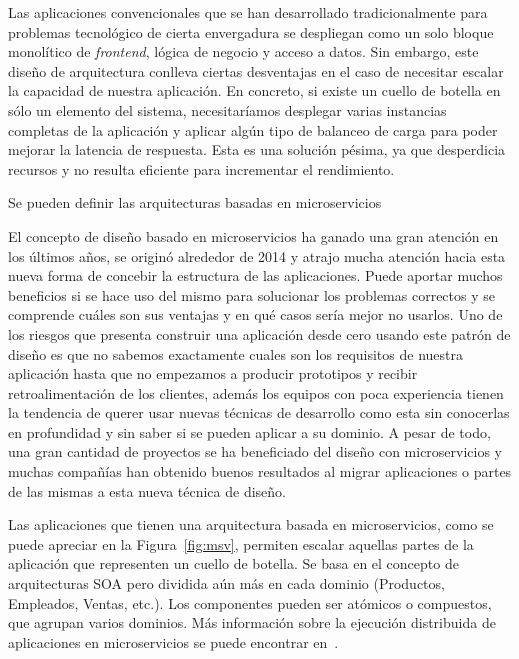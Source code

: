 Las aplicaciones convencionales que se han desarrollado tradicionalmente para problemas tecnológico de cierta envergadura se despliegan como un solo bloque monolítico de \textit{frontend}, lógica de negocio y acceso a datos. Sin embargo, este diseño de arquitectura conlleva ciertas desventajas en el caso de necesitar escalar la capacidad de nuestra aplicación. En concreto, si existe un cuello de botella en sólo un elemento del sistema, necesitaríamos desplegar varias instancias completas de la aplicación y aplicar algún tipo de balanceo de carga para poder mejorar la latencia de respuesta. Esta es una solución pésima, ya que desperdicia recursos y no resulta eficiente para incrementar el rendimiento.

Se pueden definir las arquitecturas basadas en microservicios

El concepto de diseño basado en microservicios ha ganado una gran atención en los últimos años, se originó alrededor de 2014 y atrajo mucha atención hacia esta nueva forma de concebir la estructura de las aplicaciones. Puede aportar muchos beneficios si se hace uso del mismo para solucionar los problemas correctos y se comprende cuáles son sus ventajas y en qué casos sería mejor no usarlos. Uno de los riesgos que presenta construir una aplicación desde cero usando este patrón de diseño es que no sabemos exactamente cuales son los requisitos de nuestra aplicación hasta que no empezamos a producir prototipos y recibir retroalimentación de los clientes, además los equipos con poca experiencia tienen la tendencia de querer usar nuevas técnicas de desarrollo como esta sin conocerlas en profundidad y sin saber si se pueden aplicar a su dominio. A pesar de todo, una gran cantidad de proyectos se ha beneficiado del diseño con microservicios y muchas compañías han obtenido buenos resultados al migrar aplicaciones o partes de las mismas a esta nueva técnica de diseño. 

Las aplicaciones que tienen una arquitectura basada en microservicios, como se puede apreciar en la Figura~\ref{fig:msv}, permiten escalar aquellas partes de la aplicación que representen un cuello de botella. Se basa en el concepto de arquitecturas SOA pero dividida aún más en cada dominio (Productos, Empleados, Ventas, etc.). Los componentes pueden ser atómicos o compuestos, que agrupan varios dominios. Más información sobre la ejecución distribuida de aplicaciones en microservicios se puede encontrar en~\cite{mservices}.

